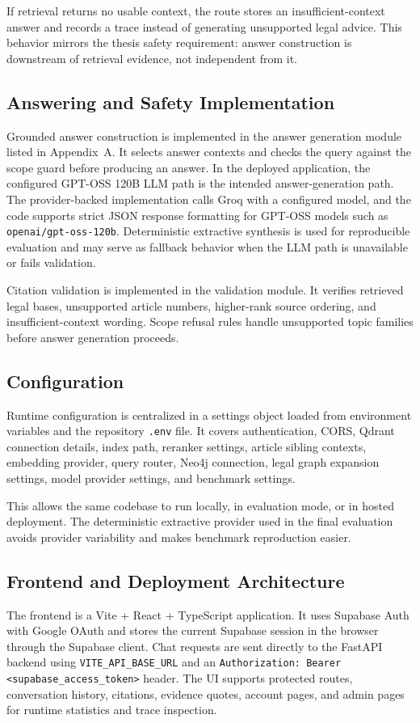 If retrieval returns no usable context, the route stores an insufficient-context answer and records a trace instead of generating unsupported legal advice. This behavior mirrors the thesis safety requirement: answer construction is downstream of retrieval evidence, not independent from it.

\subsection{Answering and Safety Implementation}
Grounded answer construction is implemented in the answer generation module listed in Appendix~A. It selects answer contexts and checks the query against the scope guard before producing an answer. In the deployed application, the configured GPT-OSS 120B LLM path is the intended answer-generation path. The provider-backed implementation calls Groq with a configured model, and the code supports strict JSON response formatting for GPT-OSS models such as \texttt{openai/gpt-oss-120b}. Deterministic extractive synthesis is used for reproducible evaluation and may serve as fallback behavior when the LLM path is unavailable or fails validation.

Citation validation is implemented in the validation module. It verifies retrieved legal bases, unsupported article numbers, higher-rank source ordering, and insufficient-context wording. Scope refusal rules handle unsupported topic families before answer generation proceeds.

\subsection{Configuration}
Runtime configuration is centralized in a settings object loaded from environment variables and the repository \texttt{.env} file. It covers authentication, CORS, Qdrant connection details, index path, reranker settings, article sibling contexts, embedding provider, query router, Neo4j connection, legal graph expansion settings, model provider settings, and benchmark settings.

This allows the same codebase to run locally, in evaluation mode, or in hosted deployment. The deterministic extractive provider used in the final evaluation avoids provider variability and makes benchmark reproduction easier.

\subsection{Frontend and Deployment Architecture}
The frontend is a Vite + React + TypeScript application. It uses Supabase Auth with Google OAuth and stores the current Supabase session in the browser through the Supabase client. Chat requests are sent directly to the FastAPI backend using \texttt{VITE\_API\_BASE\_URL} and an \texttt{Authorization: Bearer <supabase\_access\_token>} header. The UI supports protected routes, conversation history, citations, evidence quotes, account pages, and admin pages for runtime statistics and trace inspection.

